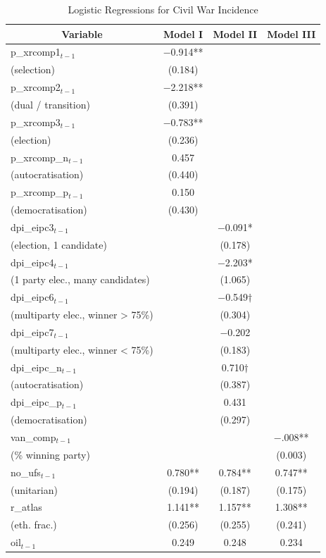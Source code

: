 \documentclass[a4paper,12pt]{article}
\begin{document}
\begin{table}[htbp]\centering \footnotesize \caption{Logistic Regressions for Civil War Incidence \label{table1:sumstats}}
\begin{tabular}{l c c c}\hline\hline
\multicolumn{1}{c}{\textbf{Variable}} & \textbf{Model I}
 & \textbf{Model II}& \textbf{Model III}\\ \hline
p\_xrcomp1$_{t-1}$ & $-$0.914**\\
(selection) & (0.184)\\
p\_xrcomp2$_{t-1}$ & $-$2.218**\\
(dual / transition) & (0.391)\\
p\_xrcomp3$_{t-1}$ & $-$0.783**\\
(election) & (0.236)\\
p\_xrcomp\_n$_{t-1}$ & 0.457\\
(autocratisation) & (0.440)\\
p\_xrcomp\_p$_{t-1}$ & 0.150\\
(democratisation) & (0.430)\\
dpi\_eipc3$_{t-1}$ & & $-$0.091*\\
(election, 1 candidate) & & (0.178)\\
dpi\_eipc4$_{t-1}$ & & $-$2.203*\\
(1 party elec., many candidates) & & (1.065)\\
dpi\_eipc6$_{t-1}$  & & $-$0.549$\dagger$\\
(multiparty elec., winner > 75\%) & & (0.304)\\
dpi\_eipc7$_{t-1}$ & & $-$0.202\\
(multiparty elec., winner < 75\%) & & (0.183)\\
dpi\_eipc\_n$_{t-1}$ & & 0.710$\dagger$\\
(autocratisation) & & (0.387)\\
dpi\_eipc\_p$_{t-1}$ & & 0.431\\
(democratisation) & & (0.297)\\
van\_comp$_{t-1}$ & & & $-$.008**\\
(\% winning party) & & & (0.003)\\
no\_ufs$_{t-1}$ & 0.780** & 0.784** & 0.747**\\
(unitarian) & (0.194) & (0.187) & (0.175)\\
r\_atlas & 1.141** & 1.157** & 1.308**\\
(eth. frac.) & (0.256) & (0.255) & (0.241)\\
oil$_{t-1}$ & 0.249 & 0.248 & 0.234\\

\end{tabular}
\end{table}
\end{document}
